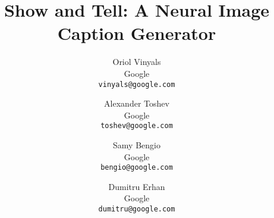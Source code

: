 \documentclass[10pt,twocolumn,letterpaper]{article}
\begin{document}
\title{Show and Tell: A Neural Image Caption Generator}

\author{Oriol Vinyals\\
Google\\
{\tt\small vinyals@google.com}
\and
Alexander Toshev\\
Google\\
{\tt\small toshev@google.com}
\and
Samy Bengio\\
Google\\
{\tt\small bengio@google.com}
\and
Dumitru Erhan\\
Google\\
{\tt\small dumitru@google.com}
}

\maketitle















{\small


}
\end{document}
